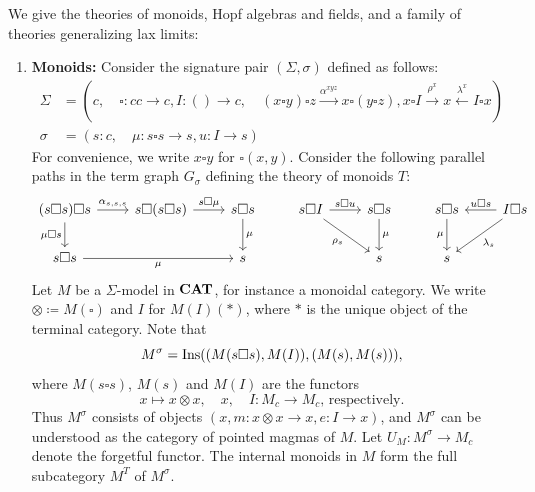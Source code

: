 \begin{examples}\label{exs:theories}
   We give the theories of monoids, Hopf algebras and fields, and a family of theories generalizing lax limits:
   \begin{enumerate}
       \item \textbf{Monoids:} Consider the signature pair $(\Sigma, \sigma)$ defined as follows:
       \begin{align*}
       \Sigma
       &= (c,\quad \square\colon cc\to c, I\colon ()\to c,\quad (x\square y)\square z\xrightarrow{\alpha^{xyz}} x\square (y\square z), x\square I\xrightarrow{\rho^x} x\xleftarrow{\lambda^x} I\square x)\\
       \sigma
       &= (s\colon c,\quad \mu\colon s\square s\to s, u\colon I\to s)
   \end{align*}
   For convenience, we write $x\square y$ for $\square(x,y)$. Consider the following parallel paths in the term graph $G_{\sigma}$ defining the theory of monoids $T$:
   \[
   \begin{tikzcd}[column sep=0.8 cm]
   (s \square s) \square s \arrow[d, "\mu \square s"'] \arrow[r, "\alpha_{s,s,s}"] & s \square (s \square s) \arrow[r, "s \square \mu"] & s \square s \arrow[d, "\mu"] & s \square I \arrow[r, "s \square u"] \arrow[rd, "\rho_s"'] & s \square s \arrow[d, "\mu"] & s \square s \arrow[d, "\mu"'] & I \square s \arrow[l, "u \square s"'] \arrow[ld, "\lambda_s"] \\
   s \square s \arrow[rr, "\mu"'] & & s & & s & s &
   \end{tikzcd}
   \]
   Let $M$ be a $\Sigma$-model in $\mathbf{CAT}$, for instance a monoidal category. We write $\otimes\coloneqq M(\square)$ and $I$ for $M(I)(*)$, where $*$ is the unique object of the terminal category. Note that
   \[
   M^\sigma = \mathrm{Ins}((M(s\square s),M(I)), (M(s),M(s))),
   \]
   where $M(s\square s)$, $M(s)$ and $M(I)$ are the functors
   \[
   x\mapsto x\otimes x, \quad x, \quad I\colon M_c\to M_c\text{, respectively.}
   \]
   Thus $M^\sigma$ consists of objects $(x,m\colon x\otimes x\to x, e\colon I\to x)$, and $M^\sigma$ can be understood as the category of pointed magmas of $M$. Let $U_M\colon M^\sigma\to M_c$ denote the forgetful functor. The internal monoids in $M$ form the full subcategory $M^T$ of $M^\sigma$.


\end{enumerate}
\end{examples}
